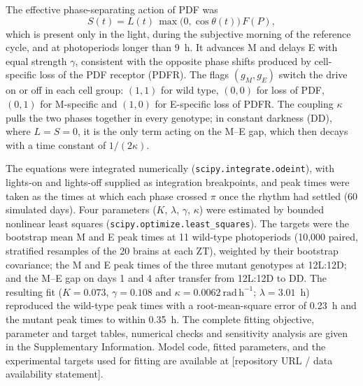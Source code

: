 The effective phase-separating action of PDF was
\begin{equation}
S(t) = L(t)\,\max\bigl(0,\cos\theta(t)\bigr)\,F(P),
\end{equation}
which is present only in the light, during the subjective morning of the
reference cycle, and at photoperiods longer than 9~h. It advances M and
delays E with equal strength $\gamma$, consistent with the opposite phase
shifts produced by cell-specific loss of the PDF receptor (PDFR). The
flags $(g_M, g_E)$ switch the drive on or off in each cell group: $(1,1)$
for wild type, $(0,0)$ for loss of PDF, $(0,1)$ for M-specific and
$(1,0)$ for E-specific loss of PDFR. The coupling $\kappa$ pulls the two
phases together in every genotype; in constant darkness (DD), where
$L = S = 0$, it is the only term acting on the M--E gap, which then
decays with a time constant of $1/(2\kappa)$.

The equations were integrated numerically
(\texttt{scipy.integrate.odeint}), with lights-on and lights-off supplied
as integration breakpoints, and peak times were taken as the times at
which each phase crossed $\pi$ once the rhythm had settled (60 simulated
days). Four parameters ($K$, $\lambda$, $\gamma$, $\kappa$) were
estimated by bounded nonlinear least squares
(\texttt{scipy.optimize.least\_squares}). The targets were the bootstrap
mean M and E peak times at 11 wild-type photoperiods (10,000 paired,
stratified resamples of the 20 brains at each ZT), weighted by their
bootstrap covariance; the M and E peak times of the three mutant
genotypes at 12L:12D; and the M--E gap on days 1 and 4 after transfer
from 12L:12D to DD. The resulting fit ($K=0.073$, $\gamma=0.108$ and
$\kappa=0.0062~\mathrm{rad\,h^{-1}}$; $\lambda=3.01$~h) reproduced the
wild-type peak times with a root-mean-square error of 0.23~h and the
mutant peak times to within 0.35~h. The complete fitting objective,
parameter and target tables, numerical checks and sensitivity analysis
are given in the Supplementary Information. Model code, fitted
parameters, and the experimental targets used for fitting are available
at [repository URL / data availability statement].
